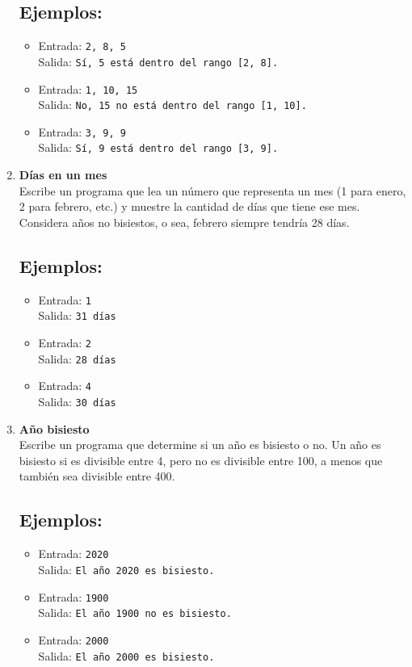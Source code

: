 \begin{enumerate}
    \subsection*{Ejemplos:}
    \begin{itemize}
        \item Entrada: \texttt{2, 8, 5}\\
              Salida: \texttt{Sí, 5 está dentro del rango [2, 8].}
        \item Entrada: \texttt{1, 10, 15}\\
              Salida: \texttt{No, 15 no está dentro del rango [1, 10].}
        \item Entrada: \texttt{3, 9, 9}\\
              Salida: \texttt{Sí, 9 está dentro del rango [3, 9].}
    \end{itemize}

    \item \textbf{Días en un mes}\\
    Escribe un programa que lea un número que representa un mes (1 para enero, 2 para febrero, etc.) y muestre la cantidad de días que tiene ese mes. Considera años no bisiestos, o sea, febrero siempre tendría 28 días.
    \subsection*{Ejemplos:}
    \begin{itemize}
        \item Entrada: \texttt{1}\\
              Salida: \texttt{31 días}
        \item Entrada: \texttt{2}\\
              Salida: \texttt{28 días}
        \item Entrada: \texttt{4}\\
              Salida: \texttt{30 días}
    \end{itemize}

    \item \textbf{Año bisiesto}\\
    Escribe un programa que determine si un año es bisiesto o no. Un año es bisiesto si es divisible entre 4, pero no es divisible entre 100, a menos que también sea divisible entre 400.
    \subsection*{Ejemplos:}
    \begin{itemize}
        \item Entrada: \texttt{2020}\\
              Salida: \texttt{El año 2020 es bisiesto.}
        \item Entrada: \texttt{1900}\\
              Salida: \texttt{El año 1900 no es bisiesto.}
        \item Entrada: \texttt{2000}\\
              Salida: \texttt{El año 2000 es bisiesto.}
    \end{itemize}


\end{enumerate}

